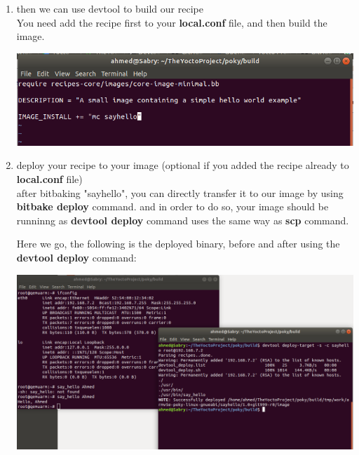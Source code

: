 \documentclass{article}
\begin{document}
\begin{enumerate}
  \item then we can use devtool to build our recipe\\
  

  You need add the recipe first to your \textbf{local.conf} file, and then build the image.
  \begin{center}
    \includegraphics[scale=0.60]{./resources/img/devtool-deploy01.png}
  \end{center}

  
  
  \item deploy your recipe to your image (optional if you added the recipe already to \textbf{local.conf} file)\\
  after bitbaking "sayhello", you can directly transfer it to our image by using \textbf{bitbake deploy} command. and in order to do so, your image should be runninng as \textbf{devtool deploy} command uses the same way as \textbf{scp} command.
  

  Here we go, the following is the deployed binary, before and after using the \textbf{devtool deploy} command:
  \begin{center}
    \includegraphics[scale=0.40]{./resources/img/devtool-deploy-target01.png}
  \end{center}


\end{enumerate}
\end{document}

